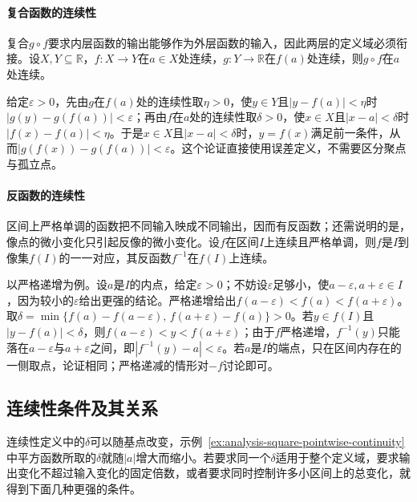 \paragraph{复合函数的连续性}
复合$g\circ f$要求内层函数的输出能够作为外层函数的输入，因此两层的定义域必须衔接。设$X,Y\subseteq\mathbb R$，$f:X\to Y$在$a\in X$处连续，$g:Y\to\mathbb R$在$f(a)$处连续，则$g\circ f$在$a$处连续。

给定$\varepsilon>0$，先由$g$在$f(a)$处的连续性取$\eta>0$，使$y\in Y$且$|y-f(a)|<\eta$时$|g(y)-g(f(a))|<\varepsilon$；再由$f$在$a$处的连续性取$\delta>0$，使$x\in X$且$|x-a|<\delta$时$|f(x)-f(a)|<\eta$。于是$x\in X$且$|x-a|<\delta$时，$y=f(x)$满足前一条件，从而$|g(f(x))-g(f(a))|<\varepsilon$。这个论证直接使用误差定义，不需要区分聚点与孤立点。

\paragraph{反函数的连续性}
\label{sec:analysis-inverse-continuity}
区间上严格单调的函数把不同输入映成不同输出，因而有反函数；还需说明的是，像点的微小变化只引起反像的微小变化。设$f$在区间$I$上连续且严格单调，则$f$是$I$到像集$f(I)$的一一对应，其反函数$f^{-1}$在$f(I)$上连续。

以严格递增为例。设$a$是$I$的内点，给定$\varepsilon>0$；不妨设$\varepsilon$足够小，使$a-\varepsilon,a+\varepsilon\in I$，因为较小的$\varepsilon$给出更强的结论。严格递增给出$f(a-\varepsilon)<f(a)<f(a+\varepsilon)$。取$\delta=\min\{f(a)-f(a-\varepsilon),\,f(a+\varepsilon)-f(a)\}>0$。若$y\in f(I)$且$|y-f(a)|<\delta$，则$f(a-\varepsilon)<y<f(a+\varepsilon)$；由于$f$严格递增，$f^{-1}(y)$只能落在$a-\varepsilon$与$a+\varepsilon$之间，即$|f^{-1}(y)-a|<\varepsilon$。若$a$是$I$的端点，只在区间内存在的一侧取点，论证相同；严格递减的情形对$-f$讨论即可。

\subsection{连续性条件及其关系}
\label{sec:analysis-continuity-relations}

连续性定义中的$\delta$可以随基点改变，示例~\ref{ex:analysis-square-pointwise-continuity}中平方函数所取的$\delta$就随$|a|$增大而缩小。若要求同一个$\delta$适用于整个定义域，要求输出变化不超过输入变化的固定倍数，或者要求同时控制许多小区间上的总变化，就得到下面几种更强的条件。

